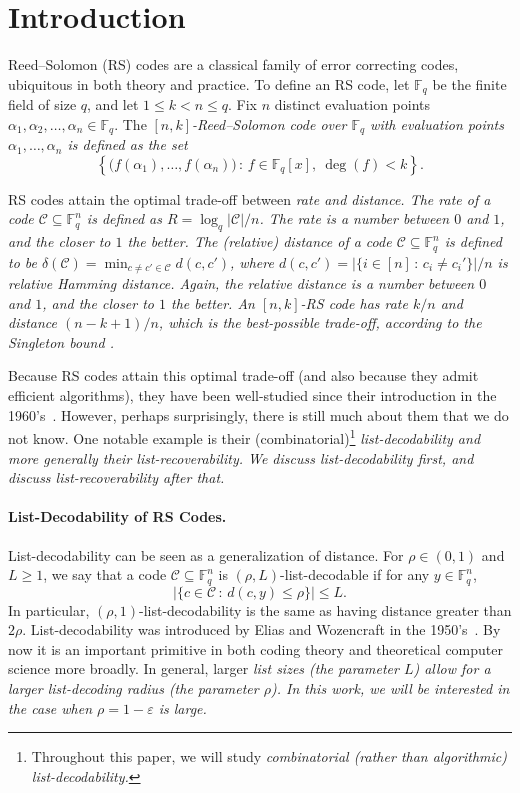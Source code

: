 \documentclass[11pt]{article}
\renewcommand{\epsilon}{\varepsilon}
\newcommand{\eps}{\epsilon}
\newcommand{\F}{{\mathbb{F}}}
\newcommand{\cC}{\mathcal{C}}
\begin{document}
\newpage

\tableofcontents
\thispagestyle{empty}

\newpage
\setcounter{page}{1}
\section{Introduction}

Reed--Solomon (RS) codes are a classical family of error correcting codes, ubiquitous in both theory and practice.  To define an  RS code, let $\F_q$ be the finite field of size $q$, and let $1 \leq k < n \leq q$.
Fix $n$ distinct evaluation points $\alpha_1, \alpha_2, \ldots, \alpha_n \in \F_q$.
The \em $[n,k]$-Reed--Solomon code \em  over $\F_q$ with evaluation points $\alpha_1, \ldots, \alpha_n$ is defined as the set
\[ \left\{ \big(f(\alpha_1), \ldots, f(\alpha_n) \big)\,:\, f \in \F_q[x], \ \deg(f) < k \right\}. \]

RS codes attain the optimal trade-off between \em rate \em and \em distance. \em
The rate of a code $\mathcal{C} \subseteq \F_q^n$ is defined as $R = \log_q|\cC|/n$.  The rate is a number between $0$ and $1$, and the closer to $1$ the better.
The (relative) distance of a code $\cC \subseteq \F_q^n$ is defined to be $\delta(\cC) = \min_{c \neq c' \in \cC} d(c,c')$, where $d(c,c') = | \{ i \in [n] \, :\, c_i \neq c_i' \} |/n$ is relative Hamming distance.  Again, the relative distance is a number between $0$ and $1$, and the closer to $1$ the better. An $[n,k]$-RS code has rate $k/n$ and distance $(n-k+1)/n$, which is the best-possible trade-off, according to the Singleton bound \cite{singletong-bound}.

Because RS codes attain this optimal trade-off (and also because they admit efficient algorithms), they have been well-studied since their introduction in the 1960's~\cite{RS-codes}.  However, perhaps surprisingly, there is still much about them that we do not know.
One notable example is their (combinatorial)\footnote{Throughout this paper, we will study \em combinatorial \em (rather than \em algorithmic\em) list-decodability.}  \em list-decodability \em and more generally their \em list-recoverability. \em  We discuss list-decodability first, and discuss list-recoverability after that.

\paragraph{List-Decodability of RS Codes.}
List-decodability can be seen as a generalization of distance.  For $\rho \in (0,1)$ and $L \geq 1$, we say that a code $\cC \subseteq \F_q^n$ is $(\rho, L)$-list-decodable if for any $y \in \F_q^n$,
\[ |\{ c \in \cC \,:\, d(c,y) \leq \rho \}| \leq L. \]
In particular, $(\rho,1)$-list-decodability is the same as having distance greater than $2\rho$.
List-decodability was introduced by Elias and Wozencraft in the 1950's~\cite{elias, wozencraft}. By now it is an important primitive in both coding theory and theoretical computer science more broadly. In general,  larger \em list sizes \em (the parameter $L$) allow for a larger \em list-decoding radius \em (the parameter $\rho$). In this work, we will be interested in the case when $\rho = 1 - \eps$ is large.
\end{document}
